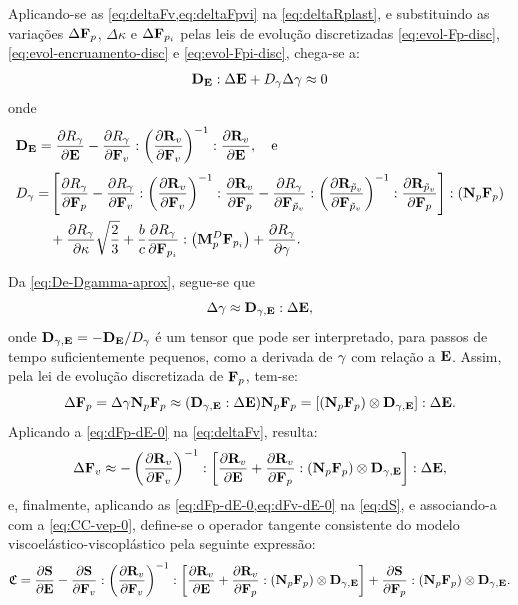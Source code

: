\documentclass[Tese.tex]{subfiles}
\begin{document}
{Aplicando-se as \cref{eq:deltaFv,eq:deltaFpvi} na \cref{eq:deltaRplast}, e substituindo as variações $\Delta\mathbf{F}_p$, $\Delta\kappa$ e $\Delta\mathbf{F}_{p_i}$ pelas leis de evolução discretizadas \eqref{eq:evol-Fp-disc}, \eqref{eq:evol-encruamento-disc} e \eqref{eq:evol-Fpi-disc}, chega-se a:
\begin{equation}
\mathbf{D}_{\mathbf{E}}:\Delta\mathbf{E} + D_{\gamma}\Delta{\gamma} \approx 0 \label{eq:De-Dgamma-aprox}
\end{equation}
onde
\begin{align}
&\mathbf{D}_{\mathbf{E}} = \dfrac{\partial R_{\gamma}}{\partial\mathbf{E}} - \dfrac{\partial R_{\gamma}}{\partial\mathbf{F}_v}:\left(\dfrac{\partial\mathbf{R}_v}{\partial\mathbf{F}_v}\right)^{-1}:\dfrac{\partial\mathbf{R}_v}{\partial\mathbf{E}},\text{\quad e}\\[0.1cm]
&\begin{aligned}
 D_{\gamma} = & \left[\dfrac{\partial R_{\gamma}}{\partial\mathbf{F}_p} -  \dfrac{\partial R_{\gamma}}{\partial\mathbf{F}_v}:\left(\dfrac{\partial\mathbf{R}_v}{\partial\mathbf{F}_v}\right)^{-1}:\dfrac{\partial\mathbf{R}_v}{\partial\mathbf{F}_p} - \dfrac{\partial R_{\gamma}}{\partial\mathbf{F}_{\tilde{p}_v}}:\left(\dfrac{\partial\mathbf{R}_{\tilde{p}_v}}{\partial\mathbf{F}_{\tilde{p}_v}}\right)^{-1}:\dfrac{\partial\mathbf{R}_{\tilde{p}_v}}{\partial\mathbf{F}_p}\right]:\left(\mathbf{N}_p\mathbf{F}_p\right) \\ &+ \dfrac{\partial R_{\gamma}}{\partial\kappa}\sqrt{\dfrac{2}{3}} + \dfrac{b}{c}\dfrac{\partial R_{\gamma}}{\partial\mathbf{F}_{p_i}}:\left(\mathbf{M}_p^D\mathbf{F}_{p_i}\right) +  \dfrac{\partial R_{\gamma}}{\partial\gamma}.
\end{aligned}
\end{align}

Da \cref{eq:De-Dgamma-aprox}, segue-se que
\begin{equation}
\Delta{\gamma} \approx \mathbf{D}_{\gamma,\mathbf{E}}:\Delta\mathbf{E},
\end{equation}
onde $\mathbf{D}_{\gamma,\mathbf{E}} = -\mathbf{D}_{\mathbf{E}}/D_{\gamma}$ é um tensor que pode ser interpretado, para passos de tempo suficientemente pequenos, como a derivada de $\gamma$ com relação a $\mathbf{E}$. Assim, pela lei de evolução discretizada de $\mathbf{F}_p$, tem-se:
\begin{equation}
\Delta\mathbf{F}_p = \Delta{\gamma}\mathbf{N}_p\mathbf{F}_p \approx (\mathbf{D}_{\gamma,\mathbf{E}}:\Delta\mathbf{E})\mathbf{N}_p\mathbf{F}_p = \left[\left(\mathbf{N}_p\mathbf{F}_p\right)\otimes\mathbf{D}_{\gamma,\mathbf{E}}\right]:\Delta\mathbf{E}. \label{eq:dFp-dE-0}
\end{equation}
Aplicando a \cref{eq:dFp-dE-0} na \cref{eq:deltaFv}, resulta:
\begin{equation}
\Delta\mathbf{F}_v \approx -\left(\dfrac{\partial\mathbf{R}_v}{\partial\mathbf{F}_v}\right)^{-1}:\left[\dfrac{\partial\mathbf{R}_v}{\partial\mathbf{E}} + \dfrac{\partial\mathbf{R}_v}{\partial\mathbf{F}_p}:\left(\mathbf{N}_p\mathbf{F}_p\right)\otimes\mathbf{D}_{\gamma,\mathbf{E}}\right]:\Delta\mathbf{E}, \label{eq:dFv-dE-0}
\end{equation}
e, finalmente, aplicando as \cref{eq:dFp-dE-0,eq:dFv-dE-0} na \cref{eq:dS}, e associando-a com a \cref{eq:CC-vep-0}, define-se o operador tangente consistente do modelo viscoelástico-viscoplástico pela seguinte expressão:
\begin{equation}
\mathfrak{C} = \dfrac{\partial\mathbf{S}}{\partial\mathbf{E}} - \dfrac{\partial\mathbf{S}}{\partial\mathbf{F}_v}:\left(\dfrac{\partial\mathbf{R}_v}{\partial\mathbf{F}_v}\right)^{-1}:\left[\dfrac{\partial\mathbf{R}_v}{\partial\mathbf{E}} + \dfrac{\partial\mathbf{R}_v}{\partial\mathbf{F}_p}:\left(\mathbf{N}_p\mathbf{F}_p\right)\otimes\mathbf{D}_{\gamma,\mathbf{E}}\right] + \dfrac{\partial\mathbf{S}}{\partial\mathbf{F}_p}:\left(\mathbf{N}_p\mathbf{F}_p\right)\otimes\mathbf{D}_{\gamma,\mathbf{E}}. \label{eq:CC-vep}
\end{equation}

}
\end{document}
